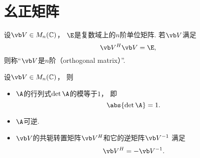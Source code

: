 \section{幺正矩阵}
\begin{definition}\label{definition:幺正矩阵.幺正矩阵的定义}
设\(\Q \in M_n(\mathbb{C})\)，
\(\E\)是复数域上的\(n\)阶单位矩阵.
若\(\Q\)满足\begin{equation}\label{equation:幺正矩阵.幺正矩阵的定义式}
	\Q^H \Q = \E,
\end{equation}
则称“\(\Q\)是\(n\)阶（orthogonal matrix）”.
\end{definition}

\begin{property}
设\(\Q \in M_n(\mathbb{C})\)，
则\begin{itemize}
	\item \(\A\)的行列式\(\det\A\)的模等于\(1\)，
	即\begin{equation}\label{equation:幺正矩阵.幺正矩阵的行列式}
		\abs{\det\A}=1.
	\end{equation}

	\item \(\A\)可逆.

	\item \(\Q\)的共轭转置矩阵\(\Q^H\)和它的逆矩阵\(\Q^{-1}\)
	满足\begin{equation}\label{equation:幺正矩阵.幺正矩阵的转置等于幺正矩阵的逆}
		\Q^H = -\Q^{-1}.
	\end{equation}
\end{itemize}
\end{property}
